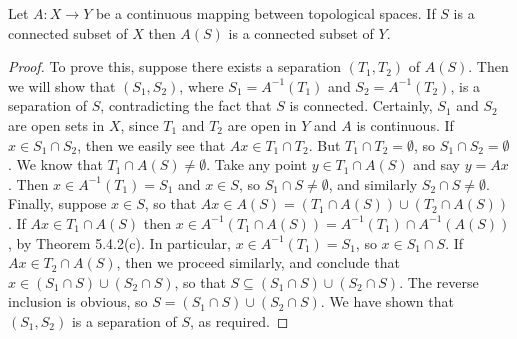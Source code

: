 \begin{theorem}
Let \( A: X \rightarrow Y \) be a continuous mapping between topological spaces. If \( S \) is a connected subset of \( X \) then \( A(S) \) is a connected subset of \( Y \).
\end{theorem}

\begin{proof}
To prove this, suppose there exists a separation \( (T_1, T_2) \) of \( A(S) \). Then we will show that \( (S_1, S_2) \), where \( S_1 = A^{-1}(T_1) \) and \( S_2 = A^{-1}(T_2) \), is a separation of \( S \), contradicting the fact that \( S \) is connected. Certainly, \( S_1 \) and \( S_2 \) are open sets in \( X \), since \( T_1 \) and \( T_2 \) are open in \( Y \) and \( A \) is continuous. If \( x \in S_1 \cap S_2 \), then we easily see that \( Ax \in T_1 \cap T_2 \). But \( T_1 \cap T_2 = \emptyset \), so \( S_1 \cap S_2 = \emptyset \). We know that \( T_1 \cap A(S) \neq \emptyset \). Take any point \( y \in T_1 \cap A(S) \) and say \( y = Ax \). Then \( x \in A^{-1}(T_1) = S_1 \) and \( x \in S \), so \( S_1 \cap S \neq \emptyset \), and similarly \( S_2 \cap S \neq \emptyset \). Finally, suppose \( x \in S \), so that \( Ax \in A(S) = (T_1 \cap A(S)) \cup (T_2 \cap A(S)) \). If \( Ax \in T_1 \cap A(S) \) then \( x \in A^{-1}(T_1 \cap A(S)) = A^{-1}(T_1) \cap A^{-1}(A(S)) \), by Theorem 5.4.2(c). In particular, \( x \in A^{-1}(T_1) = S_1 \), so \( x \in S_1 \cap S \). If \( Ax \in T_2 \cap A(S) \), then we proceed similarly, and conclude that \( x \in (S_1 \cap S) \cup (S_2 \cap S) \), so that \( S \subseteq (S_1 \cap S) \cup (S_2 \cap S) \). The reverse inclusion is obvious, so \( S = (S_1 \cap S) \cup (S_2 \cap S) \). We have shown that \( (S_1, S_2) \) is a separation of \( S \), as required.
\end{proof}

